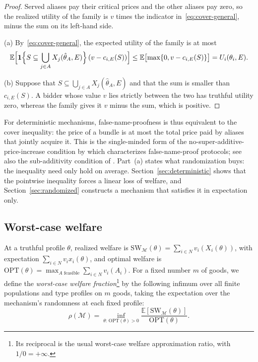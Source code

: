 \documentclass[format=acmsmall, review=false]{acmart}
\theoremstyle{acmdefinition}%
\begin{document}
\begin{proof}
Served aliases pay their critical prices and the other aliases
pay zero, so the realized utility of the family is $v$ times the
indicator in~\eqref{eq:cover-general}, minus the sum on its
left-hand side.

(a) By~\eqref{eq:cover-general}, the expected utility of the
family is at most
\[
\mathbb{E}\Bigl[\mathbf{1}\Bigl\{S\subseteq\bigcup_{j\in A}X_j(\hat\theta_A,E)\Bigr\}\,
(v-c_{i,E}(S))\Bigr]
\le
\mathbb{E}\bigl[\max\{0,v-c_{i,E}(S)\}\bigr]
=U_i(\theta_i,E).
\]

(b) Suppose that $S\subseteq\bigcup_{j\in A}X_j(\hat\theta_A,E)$
and that the sum is smaller than $c_{i,E}(S)$. A bidder whose
value $v$ lies strictly between the two has truthful utility zero,
whereas the family gives it $v$ minus the sum, which is positive.
\end{proof}

For deterministic mechanisms, false-name-proofness is thus
equivalent to the cover inequality: the price of a bundle is at
most the total price paid by aliases that jointly acquire it.
This is the single-minded form of the
no-super-additive-price-increase condition by which
\citet{yokoo2003characterization} characterizes false-name-proof
protocols; see also the sub-additivity condition of
\citet{todo2009characterizing}. Part~(a) states what
randomization buys: the inequality need only hold on average.
Section~\ref{sec:deterministic} shows that the pointwise
inequality forces a linear loss of welfare, and
Section~\ref{sec:randomized} constructs a mechanism that
satisfies it in expectation only.

\subsection{Worst-case welfare}

At a truthful profile $\theta$, realized welfare is
$\mathrm{SW}_{\mathcal M}(\theta)=\sum_{i\in N}v_i(X_i(\theta))$,
with expectation $\sum_{i\in N}v_i x_i(\theta)$, and optimal
welfare is
$\mathrm{OPT}(\theta)=\max_{A\text{ feasible}}\sum_{i\in N}v_i(A_i)$.
For a fixed number $m$ of goods, we define the
\emph{worst-case welfare fraction}\footnote{Its reciprocal is
the usual worst-case welfare approximation ratio, with
$1/0=+\infty$.} by the following infimum over all finite
populations and type profiles on $m$ goods, taking the
expectation over the mechanism's randomness at each fixed
profile:
\[
\rho(\mathcal M)
=
\inf_{\theta:\,\mathrm{OPT}(\theta)>0}
\frac{\mathbb{E}[\mathrm{SW}_{\mathcal M}(\theta)]}
     {\mathrm{OPT}(\theta)}.
\]
\end{document}

